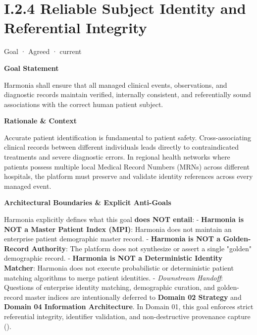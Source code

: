 \section*{I.2.4 Reliable Subject Identity and Referential Integrity}
\label{navigation:I.2.4}

\label{element:e2f8b62e2cbd486282d68b6009c06de6}
{\small Goal · Agreed · current}\par

\par\medskip\textbf{Goal Statement}\par


Harmonia shall ensure that all managed clinical events, observations, and diagnostic records maintain verified, internally consistent, and referentially sound associations with the correct human patient subject.



\par\medskip\textbf{Rationale \& Context}\par


Accurate patient identification is fundamental to patient safety. Cross-associating clinical records between different individuals leads directly to contraindicated treatments and severe diagnostic errors. In regional health networks where patients possess multiple local Medical Record Numbers (MRNs) across different hospitals, the platform must preserve and validate identity references across every managed event.



\par\medskip\textbf{Architectural Boundaries \& Explicit Anti-Goals}\par


Harmonia explicitly defines what this goal \textbf{does NOT entail}:
- \textbf{Harmonia is NOT a Master Patient Index (MPI)}: Harmonia does not maintain an enterprise patient demographic master record.
- \textbf{Harmonia is NOT a Golden-Record Authority}: The platform does not synthesize or assert a single "golden" demographic record.
- \textbf{Harmonia is NOT a Deterministic Identity Matcher}: Harmonia does not execute probabilistic or deterministic patient matching algorithms to merge patient identities.
- \emph{Downstream Handoff}: Questions of enterprise identity matching, demographic curation, and golden-record master indices are intentionally deferred to \textbf{Domain 02 Strategy} and \textbf{Domain 04 Information Architecture}. In Domain 01, this goal enforces strict referential integrity, identifier validation, and non-destructive provenance capture (\href{\detokenize{../../../../../../../../docs/markdown/01-motivation/requirements-constraints/foundational-requirements.md}}{\texttt{}}).


